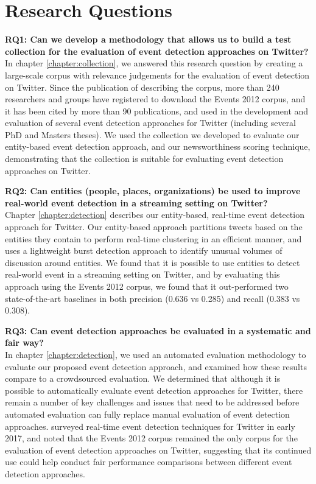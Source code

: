\section{Research Questions}
\textbf{RQ1: Can we develop a methodology that allows us to build a test collection for the evaluation of event detection approaches on Twitter?}\\
In chapter \ref{chapter:collection}, we answered this research question by creating a large-scale corpus with relevance judgements for the evaluation of event detection on Twitter.
Since the publication of \cite{McMinn2013} describing the corpus, more than 240 researchers and groups have registered to download the Events 2012 corpus, and it has been cited by more than 90 publications, and used in the development and evaluation of several event detection approaches for Twitter (including several PhD and Masters theses).
We used the collection we developed to evaluate our entity-based event detection approach, and our newsworthiness scoring technique, demonstrating that the collection is suitable for evaluating event detection approaches on Twitter.

\textbf{RQ2: Can entities (people, places, organizations) be used to improve real-world event detection in a streaming setting on Twitter?} \\
Chapter \ref{chapter:detection} describes our entity-based, real-time event detection approach for Twitter.
Our entity-based approach partitions tweets based on the entities they contain to perform real-time clustering in an efficient manner, and uses a lightweight burst detection approach to identify unusual volumes of discussion around entities.
We found that it is possible to use entities to detect real-world event in a streaming setting on Twitter, and by evaluating this approach using the Events 2012 corpus, we found that it out-performed two state-of-the-art baselines in both precision (0.636 vs 0.285) and recall (0.383 vs 0.308).

\textbf{RQ3: Can event detection approaches be evaluated in a systematic and fair way?} \\
In chapter \ref{chapter:detection}, we used an automated evaluation methodology to evaluate our proposed event detection approach, and examined how these results compare to a crowdsourced evaluation.
We determined that although it is possible to automatically evaluate event detection approaches for Twitter, there remain a number of key challenges and issues that need to be addressed before automated evaluation can fully replace manual evaluation of event detection approaches.
\cite{Hasan17} surveyed real-time event detection techniques for Twitter in early 2017, and noted that the Events 2012 corpus remained the only corpus for the evaluation of event detection approaches on Twitter, suggesting that its continued use could help conduct fair performance comparisons between different event detection approaches.

